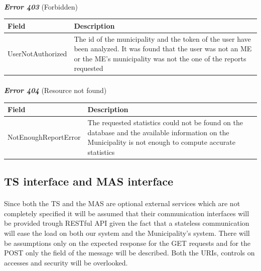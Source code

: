 						\paragraph{}
							\textit{\textbf{Error 403}} (Forbidden)
							\vspace{-2mm}
							\begin{table}[!h]
								\begin{tabular}{L{0.4\textwidth}L{0.4\textwidth}}
									\toprule
									\textbf{Field} & \textbf{Description} \\
									\midrule
								  	UserNotAuthorized & The id of the municipality and the token of the user have been analyzed. It was found that the user was not an ME or the ME's  municipality was not the one of the reports requested \\
								 	\bottomrule
								\end{tabular}
							\end{table}
						\vspace{-5mm}
						\paragraph{}
							\textit{\textbf{Error 404}} (Resource not found)
							\vspace{-2mm}
							\begin{table}[!h]
								\begin{tabular}{L{0.3\textwidth}L{0.5\textwidth}}
									\toprule
									\textbf{Field} & \textbf{Description} \\
									\midrule
								  	NotEnoughReportError & The requested statistics could not be found on the database and the available information on the Municipality is not enough to compute accurate statistics \\
								 	\bottomrule
								\end{tabular}
							\end{table}
			\subsection{TS interface and MAS interface}
				\paragraph{}
					Since both the TS and the MAS are optional external services which are not completely specified it will be assumed that their communication interfaces will be provided trough RESTful API given the fact that a stateless communication will ease the load on both our system and the Municipality's system. There will be assumptions only on the expected response for the GET requests and for the POST only the field of the message will be described. Both the URIs, controls on accesses and security will be overlooked.
